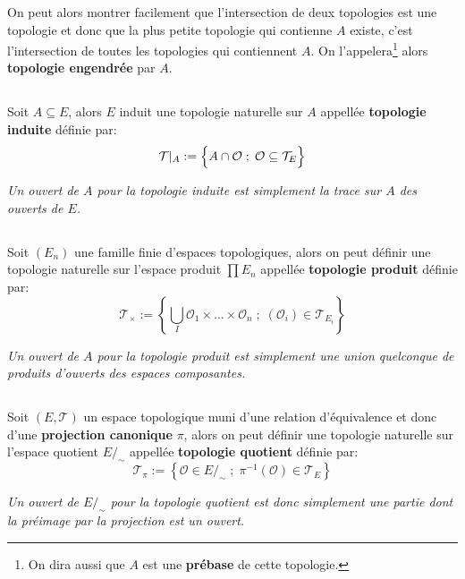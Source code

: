 On peut alors montrer facilement que l'intersection de deux topologies est une topologie et donc que la plus petite topologie qui contienne \(A\) existe, c'est l'intersection de toutes les topologies qui contiennent \(A\). On l'appelera\footnote[2]{On dira aussi que \(A\) est une \textbf{prébase} de cette topologie.} alors \textbf{topologie engendrée} par \(A\).
\subsection*{}
Soit \(A \subseteq E\), alors \(E\) induit une topologie naturelle sur \(A\) appellée \textbf{topologie induite} définie par:
\[
   \mathcal{T}\vert_A := \Bigl\{ A \cap \mathcal{O} \; ; \; \mathcal{O} \subseteq \mathcal{T}_E \Bigl\}  
\]
\begin{center}
   \textit{Un ouvert de \(A\) pour la topologie induite est simplement la trace sur \(A\) des ouverts de \(E\).}
\end{center}
\subsection*{}
Soit \((E_n)\) une famille finie d'espaces topologiques, alors on peut définir une topologie naturelle sur l'espace produit \(\prod E_n\) appellée \textbf{topologie produit} définie par:
\[
   \mathcal{T}_\times := \left\{ \bigcup_I \mathcal{O}_1 \times \ldots \times \mathcal{O}_n \; ; \; (\mathcal{O}_i) \in \mathcal{T}_{E_i} \right\}  
\]
\begin{center}
   \textit{Un ouvert de \(A\) pour la topologie produit est simplement une union quelconque de produits d'ouverts des espaces composantes.}
\end{center}
\pagebreak
\subsection*{}
Soit \((E, \mathcal{T})\) un espace topologique muni d'une relation d'équivalence et donc d'une \textbf{projection canonique} \(\pi\), alors on peut définir une topologie naturelle sur l'espace quotient \(E/_\sim\) appellée \textbf{topologie quotient} définie par:
\[
   \mathcal{T}_\pi := \left\{ \mathcal{O} \in  E/_\sim\; ; \; \pi^{-1}(\mathcal{O}) \in \mathcal{T}_{E} \right\}  
\]
\begin{center}
   \textit{Un ouvert de \(E/_\sim\) pour la topologie quotient est donc simplement une partie dont la préimage par la projection est un ouvert.}
\end{center}
